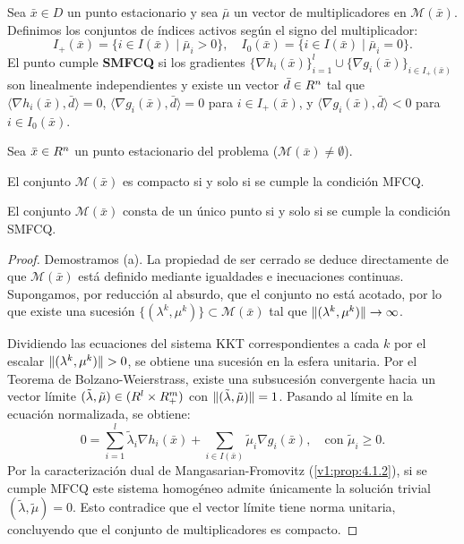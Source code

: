 \begin{definition}\label{v1:def:smfcq}
 Sea $\bar{x} \in D$ un punto estacionario y sea $\bar{\mu}$ un vector de multiplicadores en $\mathcal{M}(\bar{x})$. Definimos los conjuntos de índices activos según el signo del multiplicador:
 \[
 I_+(\bar{x}) = \{ i \in I(\bar{x}) \mid \bar{\mu}_i > 0 \}, \quad I_0(\bar{x}) = \{ i \in I(\bar{x}) \mid \bar{\mu}_i = 0 \}.
 \]
 El punto cumple \textbf{SMFCQ} si los gradientes $\{ \nabla h_i(\bar{x}) \}_{i=1}^l \cup \{ \nabla g_i(\bar{x}) \}_{i \in I_+(\bar{x})}$ son linealmente independientes y existe un vector $\bar{d} \in R^n$ tal que $\langle \nabla h_i(\bar{x}), \bar{d} \rangle = 0$, $\langle \nabla g_i(\bar{x}), \bar{d} \rangle = 0$ para $i \in I_+(\bar{x})$, y $\langle \nabla g_i(\bar{x}), \bar{d} \rangle < 0$ para $i \in I_0(\bar{x})$.
\end{definition}

\begin{proposition}\label{v1:prop:4.2.2}
 Sea $\bar{x} \in R^n$ un punto estacionario del problema ($\mathcal{M}(\bar{x}) \neq \emptyset$).
 \begin{enuthm}
 \item El conjunto $\mathcal{M}(\bar{x})$ es compacto si y solo si se cumple la condición MFCQ.
 \item El conjunto $\mathcal{M}(\bar{x})$ consta de un único punto si y solo si se cumple la condición SMFCQ.
 \end{enuthm}
\end{proposition}

\begin{proof}
 Demostramos (a). La propiedad de ser cerrado se deduce directamente de que $\mathcal{M}(\bar{x})$ está definido mediante igualdades e inecuaciones continuas. Supongamos, por reducción al absurdo, que el conjunto no está acotado, por lo que existe una sucesión $\{ (\lambda^k, \mu^k) \} \subset \mathcal{M}(\bar{x})$ tal que $\lVert(\lambda^k, \mu^k)\rVert \to \infty$.
 
 Dividiendo las ecuaciones del sistema KKT correspondientes a cada $k$ por el escalar $\lVert(\lambda^k, \mu^k)\rVert > 0$, se obtiene una sucesión en la esfera unitaria. Por el Teorema de Bolzano-Weierstrass, existe una subsucesión convergente hacia un vector límite $(\tilde{\lambda}, \tilde{\mu}) \in (R^l \times R_+^m)$ con $\lVert(\tilde{\lambda}, \tilde{\mu})\rVert = 1$. Pasando al límite en la ecuación normalizada, se obtiene:
 \[
 0 = \sum_{i=1}^l \tilde{\lambda}_i \nabla h_i(\bar{x}) + \sum_{i \in I(\bar{x})} \tilde{\mu}_i \nabla g_i(\bar{x}), \quad \text{con } \tilde{\mu}_i \ge 0.
 \]
 Por la caracterización dual de Mangasarian-Fromovitz (\cref{v1:prop:4.1.2}), si se cumple MFCQ este sistema homogéneo admite únicamente la solución trivial $(\tilde{\lambda}, \tilde{\mu}) = 0$. Esto contradice que el vector límite tiene norma unitaria, concluyendo que el conjunto de multiplicadores es compacto.
\end{proof}


